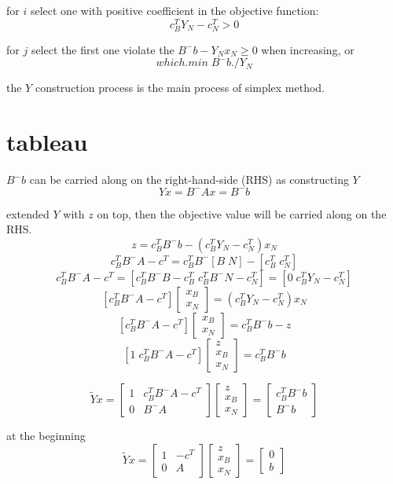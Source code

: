 \documentclass[11pt, oneside]{article}   	%
\begin{document}
for $i$ select one with positive coefficient in the objective function:
\[c_B^T Y_N - c_N^T > 0 \]

for $j$ select the first one violate the $B^{-}b - Y_N x_N \geq 0 $ when increasing, or
\[
which.min \; B^{-}b./Y_N
\]

the $Y$ construction process is the main process of simplex method.


\section{tableau}
$B^{-}b$ can be carried along on the right-hand-side (RHS) as constructing $Y$
\[
Yx = B^{-}Ax =  B^{-}b
\]

extended $Y$ with $z$ on top, then the objective value will be carried along on the RHS.
\[
z = c_B^T B^{-}b - (c_B^T Y_N - c_N^T) x_N 
\]
\[
c_B^T B^{-} A - c^T = c_B^T B^{-} [ B\; N] - [c^T_B \; c^T_N]
\]
\[
c_B^T B^{-} A - c^T = [c_B^T B^{-} B - c^T_B\; c_B^T B^{-}N - c^T_N]  = [0 \; c_B^T Y_N - c^T_N]
\]
\[
[c_B^T B^{-} A - c^T ]\begin{bmatrix} 
	x_B \\ x_N
	\end{bmatrix} = (c_B^T Y_N - c^T_N)x_N
\]
\[
[c_B^T B^{-} A - c^T ]\begin{bmatrix} 
	x_B \\ x_N
	\end{bmatrix} =  c_B^T B^{-}b - z
\]
\[[1\; c_B^T B^{-} A - c^T ]\begin{bmatrix} 
	z\\ x_B \\ x_N
	\end{bmatrix} =  c_B^T B^{-}b
\]

\[
\tilde{Y} x=  \begin{bmatrix} 
	1 & c^T_B B^- A-c^T \\
	0 & B^-A
	\end{bmatrix}\begin{bmatrix} 
	z \\ x_B \\ x_N
	\end{bmatrix} = \begin{bmatrix} 
	 c^T_B B^- b \\
	B^{-}b
	\end{bmatrix}
\]

at the beginning
\[
\tilde{Y} x=  \begin{bmatrix} 
	1 & -c^T \\
	0 & A
	\end{bmatrix}\begin{bmatrix} 
	z \\ x_B \\ x_N
	\end{bmatrix} = \begin{bmatrix} 
	 0 \\
	b
	\end{bmatrix}
\]
\end{document}
